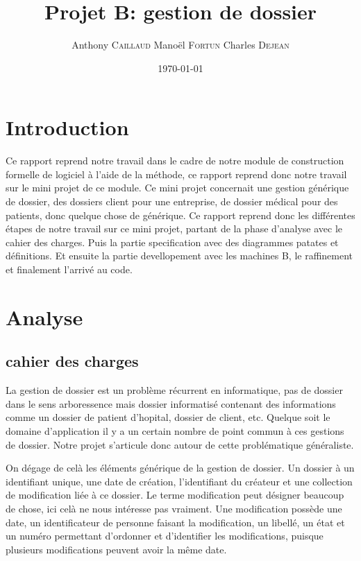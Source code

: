 \documentclass[11pt,a4paper]{article}
\title{Projet B: gestion de dossier}
\author{Anthony \textsc{Caillaud} Manoël \textsc{Fortun} Charles \textsc{Dejean}}
\date{\today}
\begin{document}
\maketitle

\clearpage \tableofcontents \clearpage


\section{Introduction}

Ce rapport reprend notre travail dans le cadre de notre module de construction formelle de logiciel à l'aide de la méthode, ce rapport reprend donc notre travail sur le mini projet de ce module. Ce mini projet concernait une gestion générique de dossier, des dossiers
client pour une entreprise, de dossier médical pour des patients, donc quelque chose de générique.
Ce rapport reprend donc les différentes étapes de notre travail sur ce mini projet, partant de la phase d'analyse avec le cahier des charges. Puis la partie specification avec des diagrammes patates et définitions. Et ensuite la partie devellopement avec les machines B, le raffinement et finalement l'arrivé au code.

\section{Analyse}

\subsection{cahier des charges}

La gestion de dossier est un problème récurrent en informatique, pas de dossier dans le sens arboressence mais dossier informatisé
contenant des informations comme un dossier de patient d'hopital, dossier de client, etc. Quelque soit le domaine d'application il y a un certain nombre de point commun à ces gestions de dossier. Notre projet s'articule donc autour de cette problématique généraliste.

On dégage de celà les éléments générique de la gestion de dossier. Un dossier à un identifiant unique, une date de création, l'identifiant du créateur et une collection de modification liée à ce dossier. Le terme modification peut désigner beaucoup de chose, ici celà ne nous intéresse pas vraiment. Une modification possède une date, un identificateur de personne faisant la modification, un libellé, un état et un numéro permettant d'ordonner et d'identifier les modifications, puisque plusieurs modifications peuvent avoir la même date.
\end{document}
